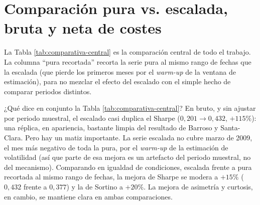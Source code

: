 \documentclass[12pt]{report} %
\begin{document}
\section{Comparación pura vs. escalada, bruta y neta de costes}

La Tabla \ref{tab:comparativa-central} es la comparación central de todo el trabajo. La columna ``pura recortada'' recorta la serie pura al mismo rango de fechas que la escalada (que pierde los primeros meses por el \textit{warm-up} de la ventana de estimación), para no mezclar el efecto del escalado con el simple hecho de comparar periodos distintos.

\begin{table}[H]
\centering
\caption{Comparación pura vs. escalada, bruta y neta de costes}
\label{tab:comparativa-central}
\end{table}

¿Qué dice en conjunto la Tabla \ref{tab:comparativa-central}? En bruto, y sin ajustar por periodo muestral, el escalado casi duplica el Sharpe ($0{,}201 \rightarrow 0{,}432$, $+115\%$): una réplica, en apariencia, bastante limpia del resultado de Barroso y Santa-Clara. Pero hay un matiz importante. La serie escalada no cubre marzo de 2009, el mes más negativo de toda la pura, por el \textit{warm-up} de la estimación de volatilidad (así que parte de esa mejora es un artefacto del periodo muestral, no del mecanismo). Comparando en igualdad de condiciones, escalada frente a pura recortada al mismo rango de fechas, la mejora de Sharpe se modera a $+15\%$ ($0{,}432$ frente a $0{,}377$) y la de Sortino a $+20\%$. La mejora de asimetría y curtosis, en cambio, se mantiene clara en ambas comparaciones.
\end{document}

